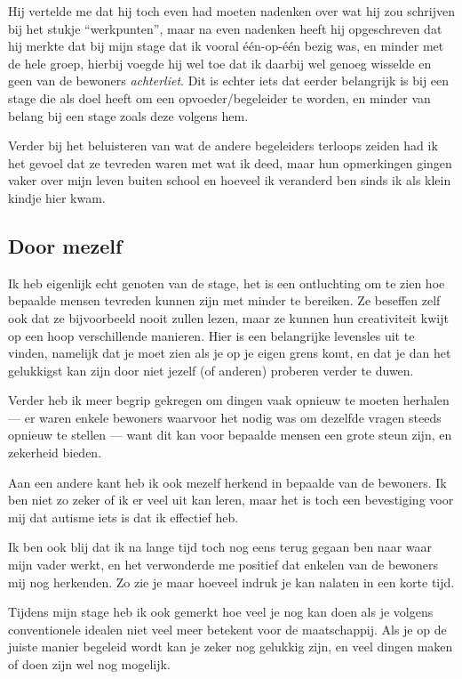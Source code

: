 \documentclass[a4paper,12pt]{article}
\begin{document}
Hij vertelde me dat hij toch even had moeten nadenken over wat hij zou schrijven bij het stukje ``werkpunten'', maar na even nadenken heeft hij opgeschreven dat hij merkte dat bij mijn stage dat ik vooral één-op-één bezig was, en minder met de hele groep, hierbij voegde hij wel toe dat ik daarbij wel genoeg wisselde en geen van de bewoners \emph{achterliet}. Dit is echter iets dat eerder belangrijk is bij een stage die als doel heeft om een opvoeder/begeleider te worden, en minder van belang bij een stage zoals deze volgens hem.

Verder bij het beluisteren van wat de andere begeleiders terloops zeiden had ik het gevoel dat ze tevreden waren met wat ik deed, maar hun opmerkingen gingen vaker over mijn leven buiten school en hoeveel ik veranderd ben sinds ik als klein kindje hier kwam.

\subsection{Door mezelf}
Ik heb eigenlijk echt genoten van de stage, het is een ontluchting om te zien hoe bepaalde mensen tevreden kunnen zijn met minder te bereiken. Ze beseffen zelf ook dat ze bijvoorbeeld nooit zullen lezen, maar ze kunnen hun creativiteit kwijt op een hoop verschillende manieren. Hier is een belangrijke levensles uit te vinden, namelijk dat je moet zien als je op je eigen grens komt, en dat je dan het gelukkigst kan zijn door niet jezelf (of anderen) proberen verder te duwen.

Verder heb ik meer begrip gekregen om dingen vaak opnieuw te moeten herhalen --- er waren enkele bewoners waarvoor het nodig was om dezelfde vragen steeds opnieuw te stellen --- want dit kan voor bepaalde mensen een grote steun zijn, en zekerheid bieden.

Aan een andere kant heb ik ook mezelf herkend in bepaalde van de bewoners. Ik ben niet zo zeker of ik er veel uit kan leren, maar het is toch een bevestiging voor mij dat autisme iets is dat ik effectief heb.

Ik ben ook blij dat ik na lange tijd toch nog eens terug gegaan ben naar waar mijn vader werkt, en het verwonderde me positief dat enkelen van de bewoners mij nog herkenden. Zo zie je maar hoeveel indruk je kan nalaten in een korte tijd.

Tijdens mijn stage heb ik ook gemerkt hoe veel je nog kan doen als je volgens conventionele idealen niet veel meer betekent voor de maatschappij. Als je op de juiste manier begeleid wordt kan je zeker nog gelukkig zijn, en veel dingen maken of doen zijn wel nog mogelijk.
\end{document}
